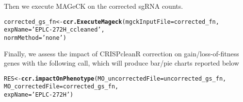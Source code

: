 \documentclass{article}\usepackage[]{graphicx}\usepackage[]{color}
\makeatletter
\newcommand{\hlstr}[1]{\textcolor[rgb]{0.192,0.494,0.8}{#1}}%
\newcommand{\hlstd}[1]{\textcolor[rgb]{0.345,0.345,0.345}{#1}}%
\newcommand{\hlkwb}[1]{\textcolor[rgb]{0.69,0.353,0.396}{#1}}%
\newcommand{\hlkwc}[1]{\textcolor[rgb]{0.333,0.667,0.333}{#1}}%
\newcommand{\hlkwd}[1]{\textcolor[rgb]{0.737,0.353,0.396}{\textbf{#1}}}%
\newenvironment{kframe}{%
 \def\at@end@of@kframe{}%
 \ifinner\ifhmode%
  \def\at@end@of@kframe{\end{minipage}}%
  \begin{minipage}{\columnwidth}%
 \fi\fi%
 \def\FrameCommand##1{\hskip\@totalleftmargin \hskip-\fboxsep
 \colorbox{shadecolor}{##1}\hskip-\fboxsep
     \hskip-\linewidth \hskip-\@totalleftmargin \hskip\columnwidth}%
 \MakeFramed {\advance\hsize-\width
   \@totalleftmargin\z@ \linewidth\hsize
   \@setminipage}}%
 {\par\unskip\endMakeFramed%
 \at@end@of@kframe}
\newenvironment{knitrout}{}{} %
\makeatother
\begin{document}
Then we execute MAGeCK on the corrected sgRNA counts.

\begin{knitrout}
\color{fgcolor}\begin{kframe}
\begin{alltt}
\hlstd{corrected_gs_fn}\hlkwb{<-}\hlkwd{ccr.ExecuteMageck}\hlstd{(}\hlkwc{mgckInputFile} \hlstd{= corrected_fn,}
                                   \hlkwc{expName} \hlstd{=} \hlstr{'EPLC-272H_ccleaned'}\hlstd{,}
                                   \hlkwc{normMethod} \hlstd{=} \hlstr{'none'}\hlstd{)}
\end{alltt}


{\ttfamily\noindent\color{warningcolor}{\#\# Warning in system(textbunch): error in running command}}\end{kframe}
\end{knitrout}

Finally, we assess the impact of CRISPcleanR correction on gain/loss-of-fitness genes with the following call, which
will produce bar/pie charts reported below
\begin{knitrout}
\color{fgcolor}\begin{kframe}
\begin{alltt}
\hlstd{RES}\hlkwb{<-}\hlkwd{ccr.impactOnPhenotype}\hlstd{(}\hlkwc{MO_uncorrectedFile} \hlstd{= uncorrected_gs_fn,}
                      \hlkwc{MO_correctedFile} \hlstd{= corrected_gs_fn,}
                      \hlkwc{expName} \hlstd{=} \hlstr{'EPLC-272H'}\hlstd{)}
\end{alltt}


{\ttfamily\noindent{}}

{\ttfamily\noindent\bfseries{}}\end{kframe}
\end{knitrout}

\printbibliography
\end{document}
